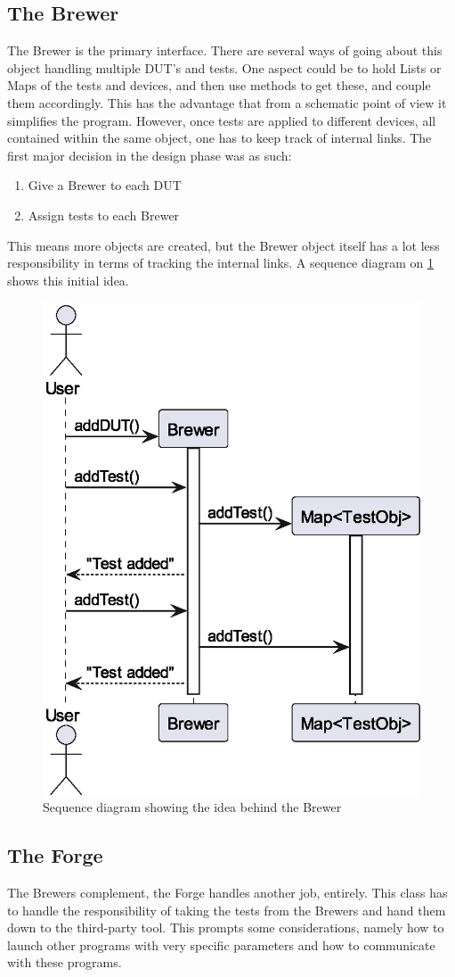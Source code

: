 \subsection{The Brewer}
The Brewer is the primary interface. There are several ways of going about this object handling multiple DUT's and tests. One aspect could be to hold Lists or Maps of the tests and devices, and then use methods to get these, and couple them accordingly. This has the advantage that from a schematic point of view it simplifies the program. However, once tests are applied to different devices, all contained within the same object, one has to keep track of internal links. The first major decision in the design phase was as such:
\begin{enumerate}
    \item Give a Brewer to each DUT
    \item Assign tests to each Brewer
\end{enumerate}
This means more objects are created, but the Brewer object itself has a lot less responsibility in terms of tracking the internal links.\newline
A sequence diagram on \cref{fig:seqBrew} shows this initial idea.
\begin{figure}
    \centering
    \caption{Sequence diagram showing the idea behind the Brewer}\label{fig:seqBrew}
    \includegraphics[width=.3\textwidth]{out/plantuml/Brewer/brewer.eps}
\end{figure}
\subsection{The Forge}
The Brewers complement, the Forge handles another job, entirely. This class has to handle the responsibility of taking the tests from the Brewers and hand them down to the third-party tool. This prompts some considerations, namely how to launch other programs with very specific parameters and how to communicate with these programs.
